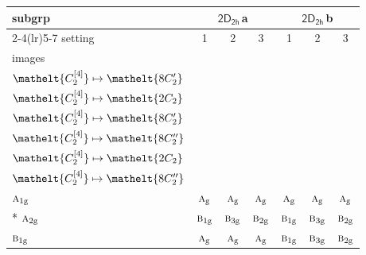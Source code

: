 \documentclass[10pt,a4paper]{article}
\numberwithin{equation}{section}
\newcommand{\eltfont}[1]{{\let\sigma\eltsigma\mathelt{#1}}}
\newcommand{\grp}[1]{\mathsf{#1}}
\newcommand{\irr}[1]{\text{\normalfont\scshape #1}}
\newcommand{\cls}[1]{\eltfont{#1}}
\newcommand{\ptag}[1]{\mathrm{#1}}
\newcommand{\clsletter}[1]{\,{\scriptsize\color{black!55}#1}}
\newcommand{\genidx}[2]{#1^{[\mathrm{#2}]}}
\begin{document}
{\small\begin{longtable}{@{}lcccccc@{}}\toprule
subgrp & \multicolumn{3}{c}{\href{2D2h.pdf}{$\grp{2D_{2h}}$}\clsletter{a}} & \multicolumn{3}{c}{\href{2D2h.pdf}{$\grp{2D_{2h}}$}\clsletter{b}}\\\cmidrule(lr){2-4}\cmidrule(lr){5-7}
setting & 1 & 2 & 3 & 1 & 2 & 3\\
images & {\scriptsize\begin{tabular}[t]{@{}c@{}}$\cls{\genidx{C_{2}}{2}} \mapsto \cls{2C_{2}}$\\$\cls{\genidx{C_{2}}{4}} \mapsto \cls{8C_{2}'}$\end{tabular}} & {\scriptsize\begin{tabular}[t]{@{}c@{}}$\cls{\genidx{C_{2}}{2}} \mapsto \cls{8C_{2}'}$\\$\cls{\genidx{C_{2}}{4}} \mapsto \cls{2C_{2}}$\end{tabular}} & {\scriptsize\begin{tabular}[t]{@{}c@{}}$\cls{\genidx{C_{2}}{2}} \mapsto \cls{8C_{2}'}$\\$\cls{\genidx{C_{2}}{4}} \mapsto \cls{8C_{2}'}$\end{tabular}} & {\scriptsize\begin{tabular}[t]{@{}c@{}}$\cls{\genidx{C_{2}}{2}} \mapsto \cls{2C_{2}}$\\$\cls{\genidx{C_{2}}{4}} \mapsto \cls{8C_{2}''}$\end{tabular}} & {\scriptsize\begin{tabular}[t]{@{}c@{}}$\cls{\genidx{C_{2}}{2}} \mapsto \cls{8C_{2}''}$\\$\cls{\genidx{C_{2}}{4}} \mapsto \cls{2C_{2}}$\end{tabular}} & {\scriptsize\begin{tabular}[t]{@{}c@{}}$\cls{\genidx{C_{2}}{2}} \mapsto \cls{8C_{2}''}$\\$\cls{\genidx{C_{2}}{4}} \mapsto \cls{8C_{2}''}$\end{tabular}}\\\midrule\endhead
\bottomrule\endfoot\endlastfoot
$\irr{a}_{1\ptag{g}}$ & $\irr{a}_{\ptag{g}}$ & $\irr{a}_{\ptag{g}}$ & $\irr{a}_{\ptag{g}}$ & $\irr{a}_{\ptag{g}}$ & $\irr{a}_{\ptag{g}}$ & $\irr{a}_{\ptag{g}}$\\*
$\irr{a}_{2\ptag{g}}$ & $\irr{b}_{1\ptag{g}}$ & $\irr{b}_{3\ptag{g}}$ & $\irr{b}_{2\ptag{g}}$ & $\irr{b}_{1\ptag{g}}$ & $\irr{b}_{3\ptag{g}}$ & $\irr{b}_{2\ptag{g}}$\\
$\irr{b}_{1\ptag{g}}$ & $\irr{a}_{\ptag{g}}$ & $\irr{a}_{\ptag{g}}$ & $\irr{a}_{\ptag{g}}$ & $\irr{b}_{1\ptag{g}}$ & $\irr{b}_{3\ptag{g}}$ & $\irr{b}_{2\ptag{g}}$\\

\end{longtable}}
\end{document}
